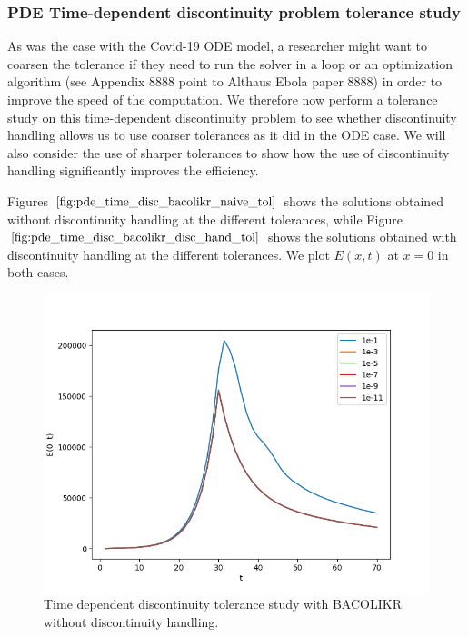 \documentclass{article}
\begin{document}
\subsubsection{PDE Time-dependent discontinuity problem tolerance study}
\label{subsubsection:pde_time_tol}

As was the case with the Covid-19 ODE model, a researcher might want to coarsen the tolerance if they need to run the solver in a loop or an optimization algorithm (see Appendix 8888 point to Althaus Ebola paper 8888) in order to improve the speed of the computation. We therefore now perform a tolerance study on this time-dependent discontinuity problem to see whether discontinuity handling allows us to use coarser tolerances as it did in the ODE case. We will also consider the use of sharper tolerances to show how the use of discontinuity handling significantly improves the efficiency.

Figures $\ref{fig:pde_time_disc_bacolikr_naive_tol}$ shows the solutions obtained without discontinuity handling at the different tolerances, while Figure $\ref{fig:pde_time_disc_bacolikr_disc_hand_tol}$ shows the solutions obtained with discontinuity handling at the different tolerances. We plot $E(x, t)$ at $x=0$ in both cases. 

\begin{figure}[H]
\centering
\includegraphics[width=0.7\linewidth]{./figures/pde_time_disc_bacolikr_naive_tol}
\caption{Time dependent discontinuity tolerance study with BACOLIKR without discontinuity handling.}
\label{fig:pde_time_disc_bacolikr_naive_tol}
\end{figure}
\end{document}
